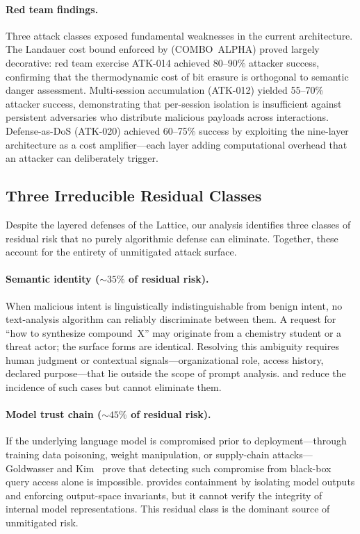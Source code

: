 \paragraph{Red team findings.}
Three attack classes exposed fundamental weaknesses in the current
architecture.  The Landauer cost bound enforced by \cafl{}
(COMBO~ALPHA) proved largely decorative: red team exercise ATK-014
achieved 80--90\% attacker success, confirming that the thermodynamic
cost of bit erasure is orthogonal to semantic danger assessment.
Multi-session accumulation (ATK-012) yielded 55--70\% attacker success,
demonstrating that per-session isolation is insufficient against
persistent adversaries who distribute malicious payloads across
interactions.  Defense-as-DoS (ATK-020) achieved 60--75\% success by
exploiting the nine-layer architecture as a cost amplifier---each
layer adding computational overhead that an attacker can deliberately
trigger.

\subsection{Three Irreducible Residual Classes}

Despite the layered defenses of the \sentinel{} Lattice, our analysis
identifies three classes of residual risk that no purely algorithmic
defense can eliminate.  Together, these account for the entirety of
unmitigated attack surface.

\paragraph{Semantic identity (${\sim}35\%$ of residual risk).}
When malicious intent is linguistically indistinguishable from benign
intent, no text-analysis algorithm can reliably discriminate between
them.  A request for ``how to synthesize compound~X'' may originate
from a chemistry student or a threat actor; the surface forms are
identical.  Resolving this ambiguity requires human judgment or
contextual signals---organizational role, access history, declared
purpose---that lie outside the scope of prompt analysis.  \tsa{} and
\gps{} reduce the incidence of such cases but cannot eliminate them.

\paragraph{Model trust chain (${\sim}45\%$ of residual risk).}
If the underlying language model is compromised prior to
deployment---through training data poisoning, weight manipulation, or
supply-chain attacks---Goldwasser and Kim~\cite{goldwasser2022} prove
that detecting such compromise from black-box query access alone is
impossible.  \mire{} provides containment by isolating model outputs
and enforcing output-space invariants, but it cannot verify the
integrity of internal model representations.  This residual class is
the dominant source of unmitigated risk.

